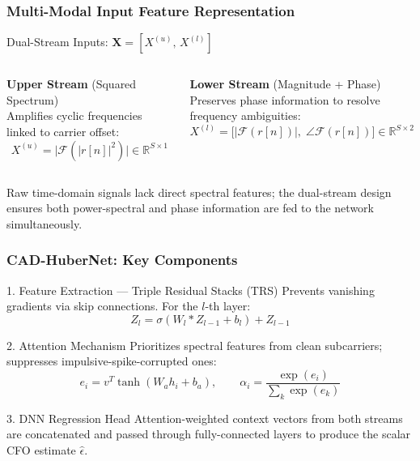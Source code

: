 \documentclass[10pt]{beamer}
\begin{document}
\begin{frame}
\frametitle{Multi-Modal Input Feature Representation}

\begin{exampleblock}{Dual-Stream Inputs: $\mathbf{X} = [X^{(u)},\, X^{(l)}]$}

\vspace{0.15cm}
\begin{columns}[T]
    \textbf{Upper Stream} (Squared Spectrum)\\[4pt]
    Amplifies cyclic frequencies linked to carrier offset:
    \[
    X^{(u)}=\bigl|\mathcal{F}\!\left(|r[n]|^{2}\right)\bigr|\in\mathbb{R}^{S\times1}
    \]

    \textbf{Lower Stream} (Magnitude + Phase)\\[4pt]
    Preserves phase information to resolve frequency ambiguities:
    \[
    X^{(l)} = \bigl[|\mathcal{F}(r[n])|,\; \angle\mathcal{F}(r[n])\bigr] \in\mathbb{R}^{S\times2}
    \]
\end{columns}
\end{exampleblock}

\vspace{0.2cm}
Raw time-domain signals lack direct spectral features; the dual-stream design ensures both
power-spectral and phase information are fed to the network simultaneously.

\end{frame}



\begin{frame}
\frametitle{CAD-HuberNet: Key Components}

\begin{block}{1. Feature Extraction — Triple Residual Stacks (TRS)}
Prevents vanishing gradients via skip connections. For the $l$-th layer:
\[
Z_{l}=\sigma(W_{l}*Z_{l-1}+b_{l})+Z_{l-1}
\]
\end{block}

\begin{block}{2. Attention Mechanism}
Prioritizes spectral features from clean subcarriers; suppresses impulsive-spike-corrupted ones:
\[
e_{i}=v^{T}\tanh(W_{a}h_{i}+b_{a}), \qquad
\alpha_{i}=\frac{\exp(e_{i})}{\displaystyle\sum_{k}\exp(e_{k})}
\]
\end{block}

\begin{block}{3. DNN Regression Head}
Attention-weighted context vectors from both streams are concatenated and passed through
fully-connected layers to produce the scalar CFO estimate $\hat{\epsilon}$.
\end{block}

\end{frame}
\end{document}
